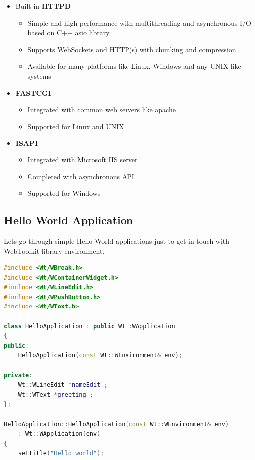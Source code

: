 \documentclass[a4paper,12pt]{article}
\begin{document}
{{{\begin{itemize}
	\item Built-in \textbf{HTTPD}
	\begin{itemize}
     \item Simple and high performance with multithreading and asynchronous I/O based on C++ asio library
     \item Supports WebSockets and HTTP(s) with chunking and compression
     \item Available for many platforms like Linux, Windows and any UNIX like systems
     \end{itemize}
	\item \textbf{FASTCGI}
	\begin{itemize}
     \item Integrated with common web servers like apache
     \item Supported for Linux and UNIX
     \end{itemize}
	\item \textbf{ISAPI}
	\begin{itemize}
     \item Integrated with Microsoft IIS server
     \item Completed with asynchronous API
     \item Supported for Windows
     \end{itemize}
\end{itemize}
}
\newpage
}

\subsection{Hello World Application}
{
Lets go through simple Hello World applications just to get in touch with WebToolkit library environment.

\begin{lstlisting}[frame=single, basicstyle=\small, language=C++, caption={A complete "Hello world" application \cite{helloworldapp}}, captionpos=b]
#include <Wt/WBreak.h>
#include <Wt/WContainerWidget.h>
#include <Wt/WLineEdit.h>
#include <Wt/WPushButton.h>
#include <Wt/WText.h>

class HelloApplication : public Wt::WApplication
{
public:
    HelloApplication(const Wt::WEnvironment& env);

private:
    Wt::WLineEdit *nameEdit_;
    Wt::WText *greeting_;
};

HelloApplication::HelloApplication(const Wt::WEnvironment& env)
    : Wt::WApplication(env)
{
    setTitle("Hello world");


\end{lstlisting}}}
\end{document}
